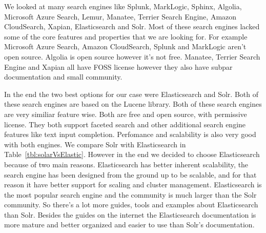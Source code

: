 \documentclass[a4paper,english]{ifimaster/ifimaster}
\begin{document}
We looked at many search engines like Splunk, MarkLogic, Sphinx, Algolia, Microsoft Azure Search, Lemur, Manatee, Terrier Search Engine, Amazon CloudSearch, Xapian, Elasticsearch and Solr. Most of these search engines lacked some of the core features and properties that we are looking for. For example Microsoft Azure Search, Amazon CloudSearch, Splunk and MarkLogic aren't open source. Algolia is open source however it's not free. Manatee, Terrier Search Engine and Xapian all have FOSS license however they also have subpar documentation and small community. 

In the end the two best options for our case were Elasticsearch and Solr. Both of these search engines are based on the Lucene library. Both of these search engines are very similiar feature wise. Both are free and open source, with permissive license. They both support faceted search and other additional search engine features like text input completion. Perfomance and scalability is also very good with both engines. We compare Solr with Elasticsearch in Table~\ref{tbl:solarVsElastic}. However in the end we decided to choose Elasticsearch because of two main reasons. Elasticsearch has better inherent scalability, the search engine has been designed from the ground up to be scalable, and for that reason it have better support for scaling and cluster management. Elasticsearch is the most popular search engine and the community is much larger than the Solr community. So there's a lot more guides, tools and examples about Elasticsearch than Solr. Besides the guides on the internet the Elasticsearch documentation is more mature and better organized and easier to use than Solr's documentation. 
\end{document}
